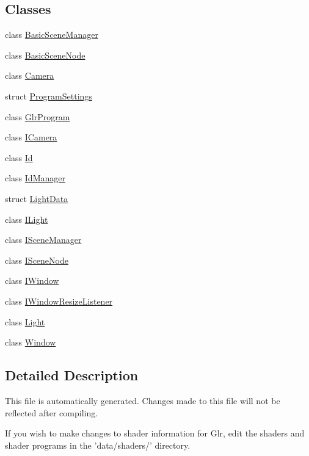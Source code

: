 \subsection*{Classes}
\begin{DoxyCompactItemize}
\item 
class \hyperlink{classglr_1_1BasicSceneManager}{Basic\-Scene\-Manager}
\item 
class \hyperlink{classglr_1_1BasicSceneNode}{Basic\-Scene\-Node}
\item 
class \hyperlink{classglr_1_1Camera}{Camera}
\item 
struct \hyperlink{structglr_1_1ProgramSettings}{Program\-Settings}
\item 
class \hyperlink{classglr_1_1GlrProgram}{Glr\-Program}
\item 
class \hyperlink{classglr_1_1ICamera}{I\-Camera}
\item 
class \hyperlink{classglr_1_1Id}{Id}
\item 
class \hyperlink{classglr_1_1IdManager}{Id\-Manager}
\item 
struct \hyperlink{structglr_1_1LightData}{Light\-Data}
\item 
class \hyperlink{classglr_1_1ILight}{I\-Light}
\item 
class \hyperlink{classglr_1_1ISceneManager}{I\-Scene\-Manager}
\item 
class \hyperlink{classglr_1_1ISceneNode}{I\-Scene\-Node}
\item 
class \hyperlink{classglr_1_1IWindow}{I\-Window}
\item 
class \hyperlink{classglr_1_1IWindowResizeListener}{I\-Window\-Resize\-Listener}
\item 
class \hyperlink{classglr_1_1Light}{Light}
\item 
class \hyperlink{classglr_1_1Window}{Window}
\end{DoxyCompactItemize}


\subsection{Detailed Description}
This file is automatically generated. Changes made to this file will not be reflected after compiling.

If you wish to make changes to shader information for Glr, edit the shaders and shader programs in the 'data/shaders/' directory. 